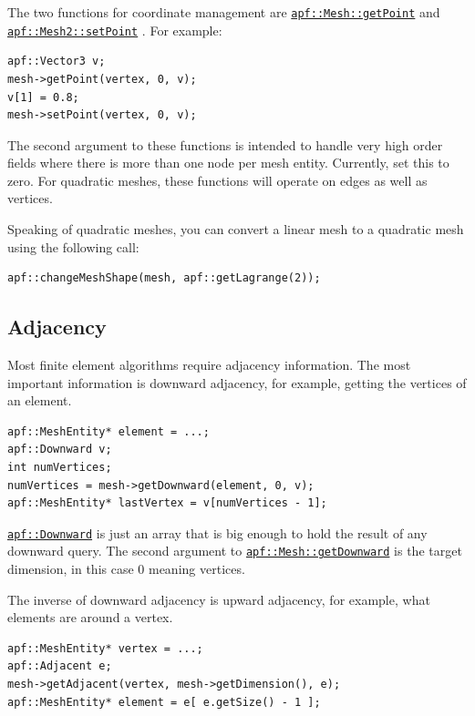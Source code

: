 \documentclass{article}
\begin{document}
The two functions for coordinate management are
\href{http://scorec.rpi.edu/~dibanez/core/classapf_1_1Mesh.html#a27c491ae08a8248e292179dbd7dacb39}{\texttt{apf::Mesh::getPoint}}
and
\href{http://scorec.rpi.edu/~dibanez/core/classapf_1_1Mesh2.html#a39ad215b2b6d6b75d55819fbbc138f57}{\texttt{apf::Mesh2::setPoint}}
.
For example:

\begin{lstlisting}
apf::Vector3 v;
mesh->getPoint(vertex, 0, v);
v[1] = 0.8;
mesh->setPoint(vertex, 0, v);
\end{lstlisting}

The second argument to these functions is intended to handle
very high order fields where there is more than one node
per mesh entity.
Currently, set this to zero.
For quadratic meshes, these functions will operate on edges as well as vertices.

Speaking of quadratic meshes, you can convert a linear mesh
to a quadratic mesh using the following call:

\begin{lstlisting}
apf::changeMeshShape(mesh, apf::getLagrange(2));
\end{lstlisting}

\subsection{Adjacency}

Most finite element algorithms require adjacency information.
The most important information is downward adjacency, for
example, getting the vertices of an element.

\begin{lstlisting}
apf::MeshEntity* element = ...;
apf::Downward v;
int numVertices;
numVertices = mesh->getDownward(element, 0, v);
apf::MeshEntity* lastVertex = v[numVertices - 1];
\end{lstlisting}

\href{http://scorec.rpi.edu/~dibanez/core/namespaceapf.html#a041eedcdfef4c64dafb2936219978328}{\texttt{apf::Downward}}
is just an array that is big enough to hold the result of any downward
query.
The second argument to
\href{http://scorec.rpi.edu/~dibanez/core/classapf_1_1Mesh.html#ae9af2075129ffd4553092049d85b276b}{\texttt{apf::Mesh::getDownward}}
is the target dimension, in this case 0 meaning vertices.

The inverse of downward adjacency is upward adjacency,
for example, what elements are around a vertex.

\begin{lstlisting}
apf::MeshEntity* vertex = ...;
apf::Adjacent e;
mesh->getAdjacent(vertex, mesh->getDimension(), e);
apf::MeshEntity* element = e[ e.getSize() - 1 ];
\end{lstlisting}
\end{document}

